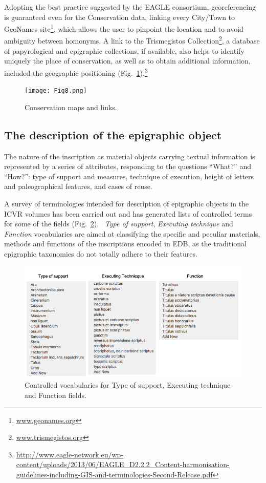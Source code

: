 \documentclass[amsthm,ebook]{saparticle}
\begin{document}
Adopting the best practice suggested by the EAGLE consortium, georeferencing is guaranteed even for the Conservation
data, linking every City/Town to GeoNames site\footnote{ \url{www.geonames.org}}, which allows the user to pinpoint the
location and to avoid ambiguity between homonyms. A link to the Trismegistos Collection\footnote{
\url{www.trismegistos.org}}, a database of papyrological and epigraphic collections, if available, also helps to identify
uniquely the place of conservation, as well as to obtain additional information, included the geographic
positioning (Fig.~\ref{fig:8new}).\footnote{\url{http://www.eagle-network.eu/wp-content/uploads/2013/06/EAGLE\_D2.2.2\_Content-harmonisation-guidelines-including-GIS-and-terminologies-Second-Release.pdf}}

\newpage
\begin{figure}[!hbp]
\centering
 \texttt{[image: Fig8.png]}
\caption{Conservation maps and links.}
\label{fig:8new}
\end{figure}



\subsection{The description of the epigraphic object }


The nature of the inscription as material objects carrying textual information is represented by a series of attributes,
responding to the questions “What?” and “How?”: type of support and measures, technique of execution, height of letters
and paleographical features, and cases of reuse.

A survey of terminologies intended for description of epigraphic objects in the ICVR volumes has been carried out and
has generated lists of controlled terms for some of the fields (Fig.~\ref{fig:8}). \ \emph{Type of support}, \emph{Executing technique} and
\emph{Function} vocabularies are aimed at classifying the specific and peculiar materials, methods and functions of the
inscriptions encoded in EDB, as the traditional epigraphic taxonomies do not totally adhere to their features.

\begin{figure}[!hbp]
\centering
 \includegraphics[width=\columnwidth]{EAGLE2016Roccoengrev-img008.png}
\caption{Controlled vocabularies for Type of support, Executing technique and Function fields.}
\label{fig:8}
\end{figure}
\end{document}
